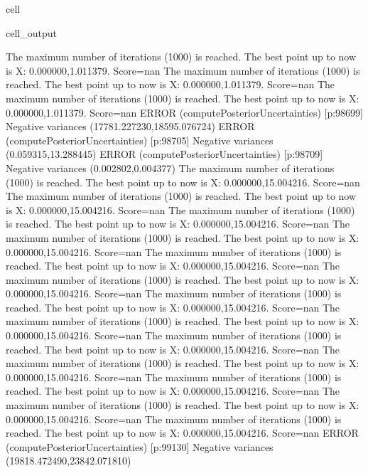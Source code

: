 \documentclass[letterpaper,10pt,english]{jupyterBook}
\begin{document}
\begin{sphinxuseclass}{cell}
\begin{sphinxVerbatimOutput}
\begin{sphinxuseclass}{cell_output}
\begin{sphinxVerbatim}[commandchars=\\\{\}]
The maximum number of iterations (1000) is reached. The best point up to now is X: \PYGZob{}0.000000,1.011379\PYGZcb{}. Score=\PYGZhy{}nan
The maximum number of iterations (1000) is reached. The best point up to now is X: \PYGZob{}0.000000,1.011379\PYGZcb{}. Score=\PYGZhy{}nan
The maximum number of iterations (1000) is reached. The best point up to now is X: \PYGZob{}0.000000,1.011379\PYGZcb{}. Score=\PYGZhy{}nan
ERROR (compute\PYGZus{}Posterior\PYGZus{}Uncertainties) [p:98699] Negative variances (\PYGZhy{}17781.227230,\PYGZhy{}18595.076724)
ERROR (compute\PYGZus{}Posterior\PYGZus{}Uncertainties) [p:98705] Negative variances (\PYGZhy{}0.059315,13.288445)
ERROR (compute\PYGZus{}Posterior\PYGZus{}Uncertainties) [p:98709] Negative variances (0.002802,\PYGZhy{}0.004377)
The maximum number of iterations (1000) is reached. The best point up to now is X: \PYGZob{}0.000000,15.004216\PYGZcb{}. Score=\PYGZhy{}nan
The maximum number of iterations (1000) is reached. The best point up to now is X: \PYGZob{}0.000000,15.004216\PYGZcb{}. Score=\PYGZhy{}nan
The maximum number of iterations (1000) is reached. The best point up to now is X: \PYGZob{}0.000000,15.004216\PYGZcb{}. Score=\PYGZhy{}nan
The maximum number of iterations (1000) is reached. The best point up to now is X: \PYGZob{}0.000000,15.004216\PYGZcb{}. Score=\PYGZhy{}nan
The maximum number of iterations (1000) is reached. The best point up to now is X: \PYGZob{}0.000000,15.004216\PYGZcb{}. Score=\PYGZhy{}nan
The maximum number of iterations (1000) is reached. The best point up to now is X: \PYGZob{}0.000000,15.004216\PYGZcb{}. Score=\PYGZhy{}nan
The maximum number of iterations (1000) is reached. The best point up to now is X: \PYGZob{}0.000000,15.004216\PYGZcb{}. Score=\PYGZhy{}nan
The maximum number of iterations (1000) is reached. The best point up to now is X: \PYGZob{}0.000000,15.004216\PYGZcb{}. Score=\PYGZhy{}nan
The maximum number of iterations (1000) is reached. The best point up to now is X: \PYGZob{}0.000000,15.004216\PYGZcb{}. Score=\PYGZhy{}nan
The maximum number of iterations (1000) is reached. The best point up to now is X: \PYGZob{}0.000000,15.004216\PYGZcb{}. Score=\PYGZhy{}nan
The maximum number of iterations (1000) is reached. The best point up to now is X: \PYGZob{}0.000000,15.004216\PYGZcb{}. Score=\PYGZhy{}nan
The maximum number of iterations (1000) is reached. The best point up to now is X: \PYGZob{}0.000000,15.004216\PYGZcb{}. Score=\PYGZhy{}nan
The maximum number of iterations (1000) is reached. The best point up to now is X: \PYGZob{}0.000000,15.004216\PYGZcb{}. Score=\PYGZhy{}nan
ERROR (compute\PYGZus{}Posterior\PYGZus{}Uncertainties) [p:99130] Negative variances (\PYGZhy{}19818.472490,\PYGZhy{}23842.071810)

\end{sphinxVerbatim}
\end{sphinxuseclass}
\end{sphinxVerbatimOutput}
\end{sphinxuseclass}
\end{document}
